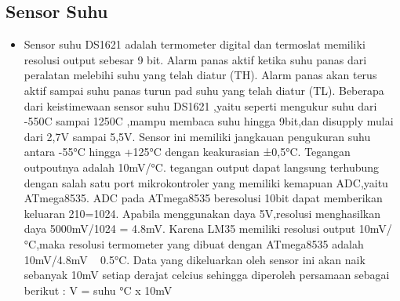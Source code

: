 \subsection{Sensor Suhu}
	\begin {itemize}
	\item Sensor suhu DS1621  adalah termometer digital dan termoslat memiliki resolusi output sebesar 9 bit. Alarm panas aktif ketika suhu panas dari peralatan melebihi suhu yang telah diatur (TH). Alarm panas akan terus aktif sampai suhu panas turun pad suhu yang telah diatur (TL). Beberapa dari keistimewaan sensor suhu DS1621 ,yaitu seperti mengukur suhu dari -550C sampai 1250C ,mampu membaca suhu hingga 9bit,dan disupply mulai dari 2,7V sampai 5,5V. Sensor ini memiliki jangkauan pengukuran suhu antara -55°C hingga +125°C dengan keakurasian ±0,5°C. Tegangan outpoutnya adalah 10mV/°C. tegangan output dapat langsung terhubung dengan salah satu port mikrokontroler yang memiliki kemapuan ADC,yaitu ATmega8535. ADC pada ATmega8535 beresolusi 10bit dapat memberikan keluaran 210=1024. Apabila menggunakan daya 5V,resolusi menghasilkan daya 5000mV/1024 = 4.8mV. Karena LM35 memiliki resolusi output 10mV/°C,maka resolusi termometer yang dibuat dengan ATmega8535 adalah 10mV/4.8mV ~ 0.5°C. Data yang dikeluarkan oleh sensor ini akan naik sebanyak 10mV setiap derajat celcius sehingga diperoleh persamaan sebagai berikut :
				V = suhu °C x 10mV
	\end{itemize}